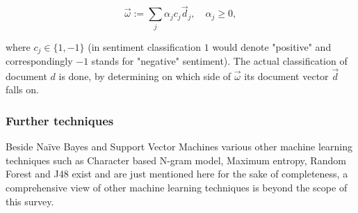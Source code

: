 \begin{equation*}
\vec{\omega} := \sum_j \alpha_j c_j \vec{d}_j,\quad \alpha_j \geq 0,
\end{equation*}

where $c_j \in \lbrace 1, -1\rbrace$ (in sentiment classification $1$ would denote "positive" and correspondingly $-1$ stands for "negative" sentiment). The actual classification of document $d$ is done, by determining on which side of $\vec{\omega}$ its document vector $\vec{d}$ falls on.

\subsubsection*{Further techniques}
Beside Na\"ive Bayes and Support Vector Machines various other machine learning techniques such as Character based N-gram model, Maximum entropy, Random Forest and J48 exist and are just mentioned here for the sake of completeness, a comprehensive view of other machine learning techniques is beyond the scope of this survey.
